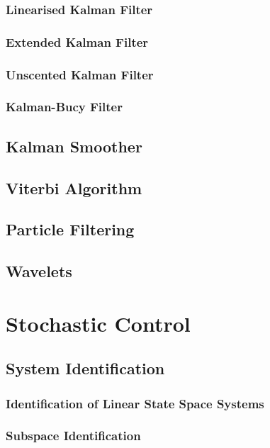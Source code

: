 \documentclass[11pt]{report} %
\begin{document}
\subsection{Linearised Kalman Filter}

\subsection{Extended Kalman Filter}

\subsection{Unscented Kalman Filter}

\subsection{Kalman-Bucy Filter}

\section{Kalman Smoother}

\section{Viterbi Algorithm}

\section{Particle Filtering}

\section{Wavelets}

\chapter{Stochastic Control}

\section{System Identification}

\subsection{Identification of Linear State Space Systems}

\subsection{Subspace Identification}
\end{document}

